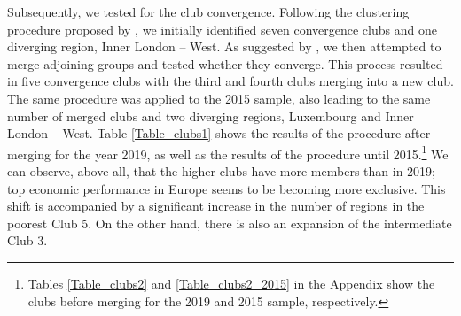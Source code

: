 \documentclass[11pt]{article}
\begin{document}
Subsequently, we tested for the club convergence. Following the clustering procedure proposed by \citeauthor{phillips2007transition}, we initially identified seven convergence clubs and one diverging region, Inner London – West. As suggested by \citet{bartkowska2012regional}, we then attempted to merge adjoining groups and tested whether they converge. This process resulted in five convergence clubs with the third and fourth clubs merging into a new club. The same procedure was applied to the 2015 sample, also leading to the same number of merged clubs and two diverging regions, Luxembourg and Inner London – West. Table \ref{Table_clubs1} shows the results of the procedure after merging for the year 2019, as well as the results of the \citeauthor{phillips2007transition} procedure until 2015.\footnote{Tables \ref{Table_clubs2} and \ref{Table_clubs2_2015} in the Appendix show the clubs before merging for the 2019 and 2015 sample, respectively.}  We can observe, above all, that the higher clubs have more members than in 2019; top economic performance in Europe seems to be becoming more exclusive. This shift is accompanied by a significant increase in the number of regions in the poorest Club 5. On the other hand, there is also an expansion of the intermediate Club 3.
\end{document}

